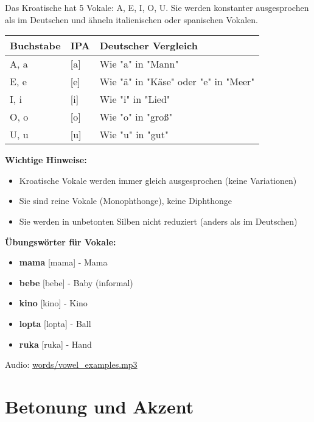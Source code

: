 Das Kroatische hat 5 Vokale: A, E, I, O, U. Sie werden konstanter ausgesprochen als im Deutschen und ähneln italienischen oder spanischen Vokalen.

\begin{tcolorbox}[breakable, colback=lightgreen!30, colframe=green!60!black, title=\textbf{Kroatische Vokale}]

\begin{center}
\begin{tabular}{lll}
\toprule
\textbf{Buchstabe} & \textbf{IPA} & \textbf{Deutscher Vergleich} \\
\midrule
A, a & [a] & Wie "a" in "Mann" \\
E, e & [e] & Wie "ä" in "Käse" oder "e" in "Meer" \\
I, i & [i] & Wie "i" in "Lied" \\
O, o & [o] & Wie "o" in "groß" \\
U, u & [u] & Wie "u" in "gut" \\
\bottomrule
\end{tabular}
\end{center}

\textbf{Wichtige Hinweise:}
\begin{itemize}
    \item Kroatische Vokale werden immer gleich ausgesprochen (keine Variationen)
    \item Sie sind reine Vokale (Monophthonge), keine Diphthonge
    \item Sie werden in unbetonten Silben nicht reduziert (anders als im Deutschen)
\end{itemize}

\textbf{Übungswörter für Vokale:}
\begin{itemize}
    \item \textbf{mama} [mama] - Mama
    \item \textbf{bebe} [bebe] - Baby (informal)
    \item \textbf{kino} [kino] - Kino
    \item \textbf{lopta} [lopta] - Ball
    \item \textbf{ruka} [ruka] - Hand
\end{itemize}

Audio: \small\url{words/vowel\_examples.mp3}

\end{tcolorbox}

\section{Betonung und Akzent}

